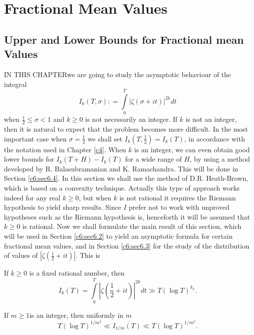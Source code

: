 \chapter{Fractional Mean Values}\label{c6}

\section{Upper and Lower Bounds for Fractional mean Values}\label{c6:sec6.1}

IN THIS CHAPTER\pageoriginale we are going to study the asymptotic
behaviour of the integral 
\begin{equation}
I_k(T,\sigma) : = \int\limits^T_0 |\zeta(\sigma + it)|^{2k} dt
\label{c6:eq6.1} 
\end{equation}
when $\frac{1}{2} \leq \sigma <1$ and $k \geq 0$ is not necessarily an
integer. If $k$ is not an integer, then it is natural to expect that
the problem becomes more difficult. In the most important case when
$\sigma =\frac{1}{2}$ we shall set $I_k (T,\frac{1}{2}) = I_k (T)$, in
accordance with the notation used in Chapter \ref{c4}. When $k$ is an
integer, we can even obtain good lower bounds for $I_k (T+H) - I_k(T)$
for a wide range of $H$, by using a method developed by
R. Balasubramanian and K. Ramachandra. This will be done in Section
\ref{c6:sec6.4}. In this section we shall use the method of
D.R. Heath-Brown, which is based on a convexity technique. Actually
this type of approach works indeed for any real $k \geq 0$, but when
$k$ is not rational it requires the Riemann hypothesis to yield sharp
results. Since $I$ prefer not to work with unproved hypotheses such as
the Riemann hypothesis is, henceforth it will be assumed that $k \geq
0$ is rational. Now we shall formulate the main result of this
section, which will be used in Section \ref{c6:sec6.2} to yield an
asymptotic formula for certain fractional mean values, and in Section
\ref{c6:sec6.3} for the study of the distribution of values of
$|\zeta(\frac{1}{2} + it)|$. This is 

\setcounter{thm}{0}
\begin{thm}\label{c6:thm6.1}
If $k \geq 0$ is a fixed rational number, then
\begin{equation}
I_k (T) = \int\limits^T_0 \left|\zeta \left(\frac{1}{2} + it \right)
\right|^{2k} dt \gg T(\log T)^{k_2}.\label{c6:eq6.2} 
\end{equation}

If $m \geq 1$\pageoriginale is an integer, then uniformly in $m$ 
\begin{equation}
T(\log T)^{1/m^2} \ll I_{1/m} (T) \ll T(\log
T)^{1/m^2}. \label{c6:eq6.3} 
\end{equation}
\end{thm}

